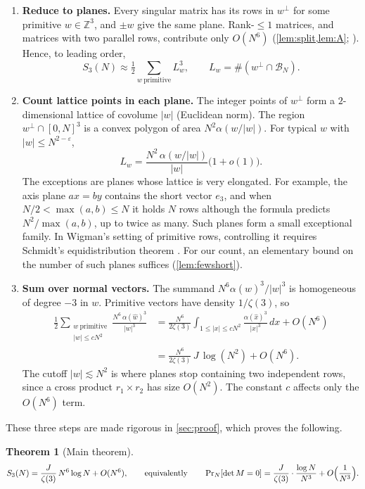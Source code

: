 \documentclass[11pt]{article}
\newtheorem{theorem}{Theorem}[section]
\theoremstyle{definition}
\newcommand{\Z}{\mathbb{Z}}
\newcommand{\BN}{\mathcal{B}_N}
\newcommand{\abs}[1]{\left\lvert #1 \right\rvert}
\begin{document}
\begin{enumerate}[label=\textbf{Step \arabic*.},leftmargin=*,itemsep=4pt]
\item \textbf{Reduce to planes.} Every singular matrix has its rows in $w^\perp$ for some primitive $w\in\Z^3$, and $\pm w$ give the same plane. Rank-$\le1$ matrices, and matrices with two parallel rows, contribute only $O(N^6)$ (\cref{lem:split,lem:A}; \cite[\S4]{Wigman}). Hence, to leading order,
\[
S_3(N)\approx\tfrac12\sum_{w\ \text{primitive}}L_w^3,\qquad L_w=\#(w^\perp\cap\BN).
\]
\item \textbf{Count lattice points in each plane.} The integer points of $w^\perp$ form a $2$-dimensional lattice of covolume $\abs{w}$ (Euclidean norm). The region $w^\perp\cap[0,N]^3$ is a convex polygon of area $N^2\alpha(w/\abs w)$. For typical $w$ with $\abs w\le N^{2-\varepsilon}$,
\[
L_w=\frac{N^2\,\alpha(w/\abs w)}{\abs w}\bigl(1+o(1)\bigr).
\]
The exceptions are planes whose lattice is very elongated. For example, the axis plane $ax=by$ contains the short vector $e_3$, and when $N/2<\max(a,b)\le N$ it holds $N$ rows although the formula predicts $N^2/\max(a,b)$, up to twice as many. Such planes form a small exceptional family. In Wigman's setting of primitive rows, controlling it requires Schmidt's equidistribution theorem \cite{Schmidt,Wigman}. For our count, an elementary bound on the number of such planes suffices (\cref{lem:fewshort}).
\item \textbf{Sum over normal vectors.} The summand $N^6\alpha(\hat w)^3/\abs{w}^3$ is homogeneous of degree $-3$ in $w$. Primitive vectors have density $1/\zeta(3)$, so
\begin{align*}
\tfrac12\sum_{\substack{w\ \text{primitive}\\ \abs w\le cN^2}}\frac{N^6\,\alpha(\hat w)^3}{\abs w^3}
&=\frac{N^6}{2\zeta(3)}\int_{1\le\abs x\le cN^2}\frac{\alpha(\hat x)^3}{\abs x^3}\,dx+O(N^6)\\
&=\frac{N^6}{2\zeta(3)}\,J\,\log(N^2)+O(N^6).
\end{align*}
The cutoff $\abs w\lesssim N^2$ is where planes stop containing two independent rows, since a cross product $r_1\times r_2$ has size $O(N^2)$. The constant $c$ affects only the $O(N^6)$ term.
\end{enumerate}

These three steps are made rigorous in \cref{sec:proof}, which proves the following.

\begin{theorem}[Main theorem]\label{claim:main}
\[
S_3(N)=\frac{J}{\zeta(3)}\,N^6\log N+O(N^6),
\qquad\text{equivalently}\qquad
\Pr\nolimits_N[\det M=0]=\frac{J}{\zeta(3)}\cdot\frac{\log N}{N^3}+O\Bigl(\frac{1}{N^3}\Bigr).
\]
\end{theorem}
\end{document}
